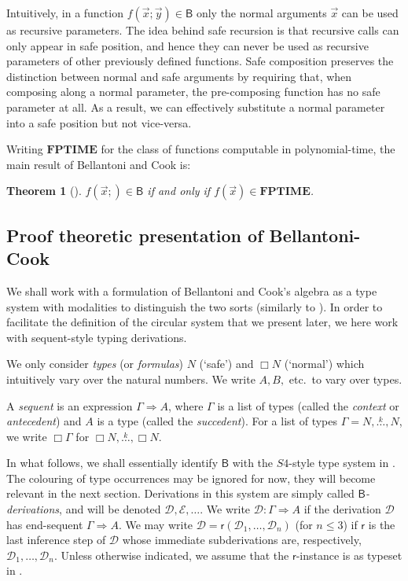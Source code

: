 \documentclass[manuscript,screen]{acmart}
\newtheorem{thm}{Theorem}
\theoremstyle{definition}
\theoremstyle{remark}
\newcommand{\n}{N}
\newcommand{\sq}{\Box}
\newcommand{\sqn}{{\sq\n}}
\newcommand{\sn}{\sqn}
\newcommand{\lists}[3]{{#2},\overset{#1}{\ldots},{#3} }
\newcommand{\ptime}{\mathbf{PTIME}}
\newcommand{\f}{\mathbf{F}}
\newcommand{\fptime}{\f\ptime}
\newcommand{\sexp}{\mathcal{E}}
\newcommand{\bc}{\mathsf{B}}
\newcommand{\seqar}{\Rightarrow}
\newcommand{\der}{\mathcal{D}}
\newcommand{\rules}{\mathsf{r}}
\begin{document}
Intuitively, in a function $f(\vec{x}; \vec y)\in \bc$ only the  normal arguments $\vec x$  can be used as recursive parameters. The idea  behind safe recursion  is that recursive calls can only appear in safe position, and hence they can never be used as recursive parameters of other previously defined functions. Safe composition preserves the distinction between normal and safe arguments by requiring that, when composing  along a normal parameter,  the pre-composing function has no safe parameter at all. As a result, we can effectively substitute a normal parameter into a safe position but not vice-versa.





Writing $\fptime$ for the class of functions computable in polynomial-time, the main result of Bellantoni and Cook is:
\begin{thm}
[\cite{BellantoniCook}] \label{thm:bellantoni}
$f(\vec x;) \in \bc $ if and only if $ f(\vec x) \in \fptime$.
\end{thm}


\subsection{Proof theoretic presentation of Bellantoni-Cook}
We shall work with a formulation of Bellantoni and Cook's algebra as a type system with modalities to distinguish the two sorts (similarly to \cite{Hofmann97}). 
% 
In order to facilitate the definition of the circular  system that we present later, we here work with sequent-style typing derivations. 

We only consider \emph{types} (or \emph{formulas}) $\n$ (`safe') and $\sq \n$ (`normal') which intuitively vary over the natural numbers.
We write $A,B,$ etc.\ to vary over types.

A \emph{sequent} is an expression $\Gamma \seqar A$, where $\Gamma$ is a list of types (called the \emph{context} or \emph{antecedent}) and $A$ is a type (called the \emph{succedent}). For a list of types $\Gamma = \lists{k}{\n}{\n}$, we write $\sq\Gamma$ for $\lists{k}{\sn}{\sn}$. 



In what follows, we shall essentially identify $\bc$ with the $S4$-style type system in .
The colouring of type occurrences may be ignored for now, they will become relevant in the next section.
Derivations in this system are simply called \emph{$\bc$-derivations}, and will be denoted $\der, \sexp, \ldots$. We write $\der: \Gamma \seqar A$ if the derivation $\der$ has end-sequent  $ \Gamma \seqar A$. We may   write $\der= \rules (\der_1, \ldots, \der_n)$  
(for $ n\leq 3$)
if $\rules$ is the last inference step of $\der$ whose immediate subderivations are, respectively,  $\der_1, \ldots, \der_n$. 
Unless otherwise indicated, we assume that the $\rules$-instance is as typeset in .
 
\end{document}
